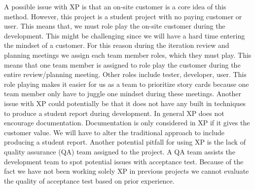 A possible issue with XP is that an on-site customer is a core idea of this method. However, this project is a student project with no paying customer or user. This means that, we must role play the on-site customer during the development. This might be challenging since we will have a hard time entering the mindset of a customer. For this reason during the iteration review and planning meetings we assign each team member roles, which they must play. This means that one team member is assigned to role play the customer during the entire review/planning meeting. Other roles include tester, developer, user. This role playing makes it easier for us as a team to prioritize story cards because one team member only have to juggle one mindset during these meetings. Another issue with XP could potentially be that it does not have any built in techniques to produce a student report during development. In general XP does not encourage documentation. Documentation is only considered in XP if it gives the customer value. We will have to alter the traditional approach to include producing a student report. Another potential pitfall for using XP is the lack of quality assurance (QA) team assigned to the project. A QA team assists the development team to spot potential issues with acceptance test. Because of the fact we have not been working solely XP in previous projects we cannot evaluate the quality of acceptance test based on prior experience.
